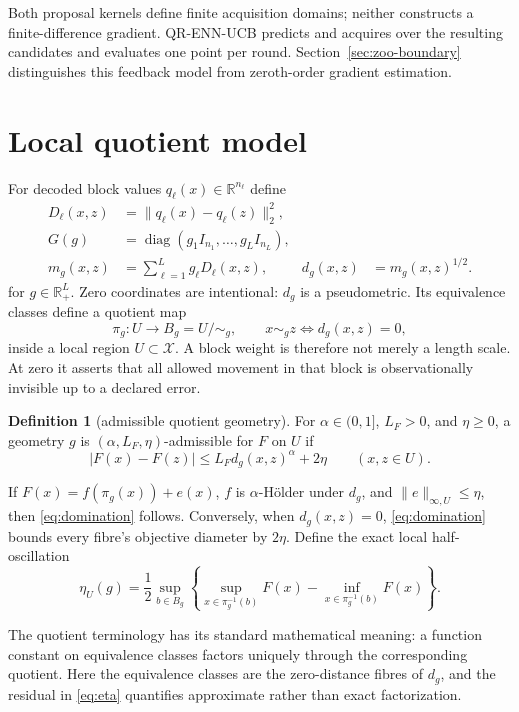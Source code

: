 \documentclass[11pt]{article}
\theoremstyle{definition}
\newtheorem{definition}[theorem]{Definition}
\theoremstyle{remark}
\newcommand{\X}{\mathcal X}
\newcommand{\R}{\mathbb R}
\newcommand{\1}{\mathbf 1}
\newcommand{\diag}{\operatorname{diag}}
\begin{document}
Both proposal kernels define finite acquisition domains; neither constructs a finite-difference
gradient.  QR-ENN-UCB predicts and acquires over the resulting candidates and evaluates one point per
round.  Section~\ref{sec:zoo-boundary} distinguishes this feedback model from zeroth-order gradient
estimation.

\section{Local quotient model}

For decoded block values $q_\ell(x)\in\R^{n_\ell}$ define
\[
\begin{aligned}
  D_\ell(x,z)&=\|q_\ell(x)-q_\ell(z)\|_2^2,\\
  G(g)&=\diag(g_1I_{n_1},\ldots,g_LI_{n_L}),\\
  m_g(x,z)&=\sum_{\ell=1}^{L}g_\ell D_\ell(x,z),
  &d_g(x,z)&=m_g(x,z)^{1/2}.
\end{aligned}
\]
for $g\in\R_+^L$.  Zero coordinates are intentional: $d_g$ is a pseudometric.  Its equivalence
classes define a quotient map
\[
  \pi_g:U\longrightarrow B_g=U/{\sim_g},
  \qquad x\sim_g z\Longleftrightarrow d_g(x,z)=0,
\]
inside a local region $U\subset\X$.  A block weight is therefore not merely a length scale.  At zero
it asserts that all allowed movement in that block is observationally invisible up to a declared
error.

\begin{definition}[admissible quotient geometry]\label{def:admissible}
For $\alpha\in(0,1]$, $L_F>0$, and $\eta\ge0$, a geometry $g$ is
$(\alpha,L_F,\eta)$-admissible for $F$ on $U$ if
\begin{equation}\label{eq:domination}
  |F(x)-F(z)|\le L_F d_g(x,z)^\alpha+2\eta
  \qquad (x,z\in U).
\end{equation}
\end{definition}
If $F(x)=f(\pi_g(x))+e(x)$, $f$ is $\alpha$-H\"older under $d_g$, and
$\|e\|_{\infty,U}\le\eta$, then \eqref{eq:domination} follows.  Conversely, when $d_g(x,z)=0$,
\eqref{eq:domination} bounds every fibre's objective diameter by $2\eta$.  Define the exact local
half-oscillation
\begin{equation}\label{eq:eta}
  \eta_U(g)=\frac12\sup_{b\in B_g}
  \left\{\sup_{x\in\pi_g^{-1}(b)}F(x)-
  \inf_{x\in\pi_g^{-1}(b)}F(x)\right\}.
\end{equation}

The quotient terminology has its standard mathematical meaning: a function constant on equivalence
classes factors uniquely through the corresponding quotient.  Here the equivalence classes are the
zero-distance fibres of $d_g$, and the residual in \eqref{eq:eta} quantifies approximate rather than
exact factorization.
\end{document}
